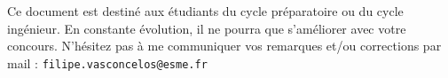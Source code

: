 \vspace*{1cm}
{\small\hbox{}\vfill

Ce document est destiné aux étudiants du cycle préparatoire 
ou du cycle ingénieur.
En constante évolution, il ne pourra que s'améliorer avec votre concours. 
N'hésitez pas à me communiquer vos remarques et/ou corrections par mail :
\verb?filipe.vasconcelos@esme.fr?

}
